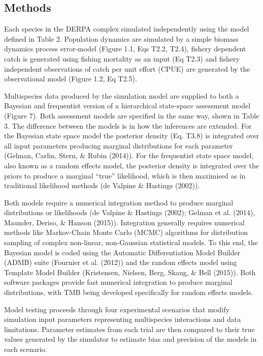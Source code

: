 \documentclass[12pt,]{scrartcl}
\begin{document}
\subsection{Methods}\label{methods}

Each species in the DERPA complex simulated independently using the
model defined in Table 2. Population dynamics are simulated by a simple
biomass dynamics process error-model (Figure 1.1, Eqs T2.2, T2.4),
fishery dependent catch is generated using fishing mortality as an input
(Eq T2.3) and fishery independent observations of catch per unit effort
(CPUE) are generated by the observational model (Figure 1.2, Eq T2.5).

Multispecies data produced by the simulation model are supplied to both
a Bayesian and frequentist version of a hierarchical state-space
assessment model (Figure 7). Both assessment models are specified in the
same way, shown in Table 3. The difference between the models is in how
the inferences are extended. For the Bayesian state space model the
posterior density (Eq. T3.8) is integrated over all input parameters
producing marginal distributions for each parameter (Gelman, Carlin,
Stern, \& Rubin (2014)). For the frequentist state space model, also
known as a random effects model, the posterior density is integrated
over the priors to produce a marginal ``true'' likelihood, which is then
maximised as in traditional likelihood methods (de Valpine \& Hastings
(2002)).

Both models require a numerical integration method to produce marginal
distributions or likelihoods (de Valpine \& Hastings (2002); Gelman et
al. (2014), Maunder, Deriso, \& Hanson (2015)). Integration generally
requires numerical methods like Markov-Chain Monte Carlo (MCMC)
algorithms for distribution sampling of complex non-linear, non-Gaussian
statistical models. To this end, the Bayesian model is coded using the
Automatic Differentiation Model Builder (ADMB) suite (Fournier et al.
(2012)) and the random effects model using Template Model Builder
(Kristensen, Nielsen, Berg, Skaug, \& Bell (2015)). Both software
packages provide fast numerical integration to produce marginal
distributions, with TMB being developed specifically for random effects
models.

Model testing proceeds through four experimental scenarios that modify
simulation input parameters representing multispecies interactions and
data limitations. Parameter estimates from each trial are then compared
to their true values generated by the simulator to estimate bias and
precision of the models in each scenario.
\end{document}
